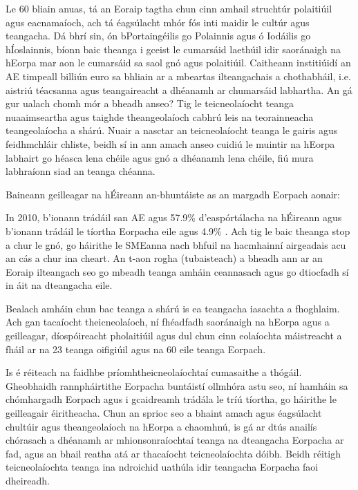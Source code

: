 \documentclass[]{../../metanetpaper}
\begin{document}
\begin{multicols}{2}
Le 60 bliain anuas, tá an Eoraip tagtha chun cinn amhail struchtúr polaitiúil agus eacnamaíoch, ach tá éagsúlacht mhór fós inti maidir le cultúr agus teangacha. Dá bhrí sin, ón bPortaingéilis go Polainnis agus ó Iodáilis go hÍoslainnis, bíonn baic theanga i gceist le cumarsáid laethúil idir saoránaigh na hEorpa mar aon le cumarsáid sa saol gnó agus polaitiúil. Caitheann institiúidí an AE timpeall billiún euro sa bhliain ar a mbeartas ilteangachais a chothabháil, i.e. aistriú téacsanna agus teangaireacht a dhéanamh ar chumarsáid labhartha. An gá gur ualach chomh mór a bheadh anseo? Tig le teicneolaíocht teanga nua\-aimseartha agus taighde theangeolaíoch cabhrú leis na teorainneacha teangeolaíocha a shárú. Nuair a nasctar an teicneolaíocht teanga le gairis agus feidhmchláir chliste, beidh sí in ann amach anseo cuidiú le muintir na hEorpa labhairt go héasca lena chéile agus gnó a dhéanamh lena chéile, fiú mura labhraíonn siad an teanga chéanna.  


Baineann geilleagar na hÉireann an-bhuntáiste as an margadh Eorpach aonair: 

In 2010, b’ionann trádáil san AE agus 57.9\% d’easpórtálacha na hÉireann agus b’ionann trádáil le tíortha Eorpacha eile agus 4.9\% \cite{csoirishtrade}.
Ach tig le baic theanga stop a chur le gnó, go háirithe le SMEanna nach bhfuil na hacmhainní airgeadais acu an cás a chur ina cheart.
An t-aon rogha (tubaisteach) a bheadh ann ar an Eoraip ilteangach seo go mbeadh teanga amháin ceannasach agus go dtiocfadh sí in áit na dteangacha eile.

Bealach amháin chun bac teanga a shárú is ea teangacha iasachta a fhoghlaim. Ach gan tacaíocht theicneolaíoch, ní fhéadfadh saoránaigh na hEorpa agus a geilleagar, díospóireacht pholaitiúil agus dul chun cinn eolaíochta máistreacht a fháil ar na 23 teanga oifigiúil agus na 60 eile teanga Eorpach. 

Is é réiteach na faidhbe príomhtheicneolaíochtaí cumasaithe a thógáil. Gheobhaidh rannpháirtithe Eorpacha buntáistí ollmhóra astu seo, ní hamháin sa chómhargadh Eorpach agus i gcaidreamh trádála le tríú tíortha, go háirithe le geilleagair éiritheacha.  Chun an sprioc seo a bhaint amach agus éagsúlacht chultúir agus theangeolaíoch na hEorpa a chaomhnú, is gá ar dtús anailís chórasach a dhéanamh ar mhionsonraíochtaí teanga na dteangacha Eorpacha ar fad, agus an bhail reatha atá ar thacaíocht teicneolaíochta dóibh. Beidh réitigh teicneolaíochta teanga ina ndroichid uathúla idir teangacha Eorpacha faoi dheireadh.  


\end{multicols}
\end{document}
